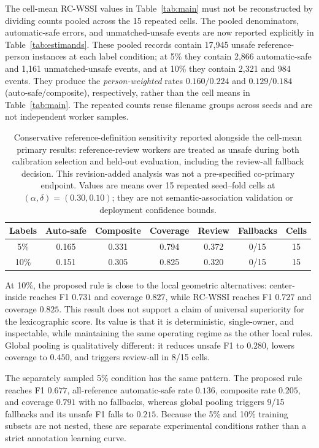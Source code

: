 \documentclass[iicol,pdflatex,sn-mathphys-num]{sn-jnl}
\begin{document}
The cell-mean RC-WSSI values in Table~\ref{tab:main} must not be reconstructed by dividing counts pooled across the 15 repeated cells. The pooled denominators, automatic-safe errors, and unmatched-unsafe events are now reported explicitly in Table~\ref{tab:estimands}. These pooled records contain 17,945 unsafe reference-person instances at each label condition; at 5\% they contain 2,866 automatic-safe and 1,161 unmatched-unsafe events, and at 10\% they contain 2,321 and 984 events. They produce the \emph{person-weighted} rates $0.160/0.224$ and $0.129/0.184$ (auto-safe/composite), respectively, rather than the cell means in Table~\ref{tab:main}. The repeated counts reuse filename groups across seeds and are not independent worker samples.

\begin{table}[t]
\caption{Conservative reference-definition sensitivity reported alongside the cell-mean primary results: reference-review workers are treated as unsafe during both calibration selection and held-out evaluation, including the review-all fallback decision. This revision-added analysis was not a pre-specified co-primary endpoint. Values are means over 15 repeated seed--fold cells at $(\alpha,\delta)=(0.30,0.10)$; they are not semantic-association validation or deployment confidence bounds.}
\label{tab:reviewunsafe}
\centering
\scriptsize
\setlength{\tabcolsep}{5pt}
\begin{tabular}{@{}c c c c c c c@{}}
\toprule
Labels & Auto-safe & Composite & Coverage & Review & Fallbacks & Cells \\
\midrule
5\%  & 0.165 & 0.331 & 0.794 & 0.372 & 0/15 & 15 \\
10\% & 0.151 & 0.305 & 0.825 & 0.320 & 0/15 & 15 \\
\bottomrule
\end{tabular}
\end{table}

At 10\%, the proposed rule is close to the local geometric alternatives: center-inside reaches F1 $0.731$ and coverage $0.827$, while RC-WSSI reaches F1 $0.727$ and coverage $0.825$. This result does not support a claim of universal superiority for the lexicographic score. Its value is that it is deterministic, single-owner, and inspectable, while maintaining the same operating regime as the other local rules. Global pooling is qualitatively different: it reduces unsafe F1 to $0.280$, lowers coverage to $0.450$, and triggers review-all in 8/15 cells.

The separately sampled 5\% condition has the same pattern. The proposed rule reaches F1 $0.677$, all-reference automatic-safe rate $0.136$, composite rate $0.205$, and coverage $0.791$ with no fallbacks, whereas global pooling triggers 9/15 fallbacks and its unsafe F1 falls to $0.215$. Because the 5\% and 10\% training subsets are not nested, these are separate experimental conditions rather than a strict annotation learning curve.
\end{document}
